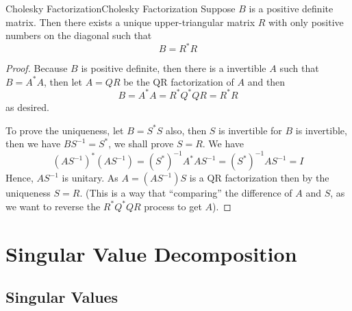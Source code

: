 \documentclass[../main.tex]{subfiles}
\begin{document}
\begin{theorem}{Cholesky Factorization}{Cholesky Factorization}
Suppose $B$ is a positive definite matrix. Then there exists a unique upper-triangular matrix $R$ with only positive numbers on the diagonal such that
\begin{equation*}
B=R^*R
\end{equation*}
\end{theorem}
\begin{proof}
Because $B$ is positive definite, then there is a invertible $A$ such that $B=A^*A$, then let $A=QR$ be the QR factorization of $A$ and then
\begin{equation*}
B = A^*A = R^*Q^*QR = R^*R
\end{equation*}
as desired.

To prove the uniqueness, let $B=S^*S$ also, then $S$ is invertible for $B$ is invertible, then we have $BS^{-1}=S^*$, we shall prove $S=R$. We have
\begin{equation*}
	(AS^{-1})^*(AS^{-1}) = (S^*)^{-1}A^*AS^{-1} = (S^*)^{-1}AS^{-1} = I
\end{equation*}
Hence,  $AS^{-1}$ is unitary. As $A=(AS^{-1})S$ is a QR factorization then by the uniqueness $S=R$. (This is a way that ``comparing'' the difference of $A$ and $S$, as we want to reverse the $R^*Q^*QR$ process to get $A$).
\end{proof}

\section{Singular Value Decomposition}
\subsection{Singular Values}
\end{document}
